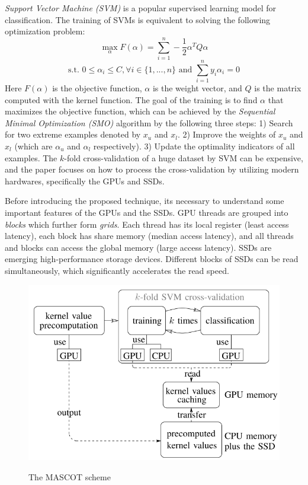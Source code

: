 \documentclass[paper=a4, fontsize=18pt]{article} %
\numberwithin{equation}{section} %
\numberwithin{figure}{section} %
\numberwithin{table}{section} %
\begin{document}
\emph{Support Vector Machine (SVM)} is a popular supervised learning model for classification. The training of SVMs is equivalent to solving the following optimization problem:
\[
\max\limits_{\alpha} F(\alpha) = \sum\limits_{i=1}^n - \frac{1}{2} \alpha^T Q \alpha
\]
\[
\mbox{s.t. } 0 \leq \alpha_i \leq C, \forall i \in \{1, ..., n\} \mbox{ and } \sum\limits_{i=1}^n y_i \alpha_i = 0
\]
Here $F(\alpha)$ is the objective function, $\alpha$ is the weight vector, and $Q$ is the matrix computed with the kernel function. The goal of the training is to find $\alpha$ that maximizes the objective function, which can be achieved by the \emph{Sequential Minimal Optimization (SMO)} algorithm  by the following three steps: 1) Search for two extreme examples denoted by $x_u$ and $x_l$. 2) Improve the weights of $x_u$ and $x_l$ (which are $\alpha_u$ and $\alpha_l$ respectively). 3) Update the optimality indicators of all examples.
The $k$-fold cross-validation of a huge dataset by SVM can be expensive, and the paper focuses on how to process the cross-validation by utilizing modern hardwares, specifically the GPUs and SSDs.

Before introducing the proposed technique, its necessary to understand some important features of the GPUs and the SSDs. GPU threads are grouped into \emph{blocks} which further form \emph{grids}. Each thread has its local register (least access latency), each block has share memory (median access latency), and all threads and blocks can access the global memory (large access latency). SSDs are emerging high-performance storage devices. Different blocks of SSDs can be read simultaneously, which significantly accelerates the read speed.

\begin{figure}[h]
  \centering
  \includegraphics[width=.7\linewidth]{8_8_mascot.png}\\
  \caption{The MASCOT scheme}\label{fig:mascot}
\end{figure}
\end{document}
